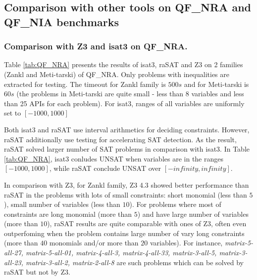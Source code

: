 \begin{table*}[t]
\centering
{}
    \medskip
   	\caption{Experiments of strategies on Zankl family}
   	\label{tab:strategies-zankl}
\end{table*}

\subsection {Comparison with other tools on QF\_NRA and QF\_NIA benchmarks} 
\label{sec:comparisons}
\subsubsection{Comparison with Z3 and isat3 on QF\_NRA.}
Table \ref{tab:QF_NRA} presents the results of isat3, raSAT and Z3 on 2 families (Zankl and Meti-tarski) of QF\_NRA. Only problems with inequalities are extracted for testing. The timeout for Zankl family is $500s$ and for Meti-tarski is $60s$ (the problems in Meti-tarski are quite small - less than 8 variables and less than 25 APIs for each problem). For isat3, ranges of all variables are uniformly set to $[-1000, 1000]$

Both isat3 and raSAT use interval arithmetics for deciding constraints. However, raSAT additionally use testing for accelerating SAT detection. As the result, raSAT solved larger number of SAT problems in comparison with isat3. In Table \ref{tab:QF_NRA}, isat3 conludes UNSAT when variables are in the ranges $[-1000, 1000]$, while raSAT conclude UNSAT over $[-infinity, infinity]$.


In comparison with Z3, for Zankl family, Z3 4.3 showed better performance than raSAT in the problems with lots of small constraints: short monomial (less than $5$), small number of variables (less than $10$). For problems where most of constraints are long monomial (more than $5$) and have large number of variables (more than $10$), raSAT results are quite comparable with ones of Z3, often even outperfoming when the problem contains large number of vary long constraints (more than $40$ monomials and/or more than $20$ variables). For instance, \textit{matrix-5-all-27, matrix-5-all-01, matrix-4-all-3, matrix-4-all-33, matrix-3-all-5, matrix-3-all-23, matrix-3-all-2, matrix-2-all-8} are such problems which can be solved by raSAT but not by Z3.

